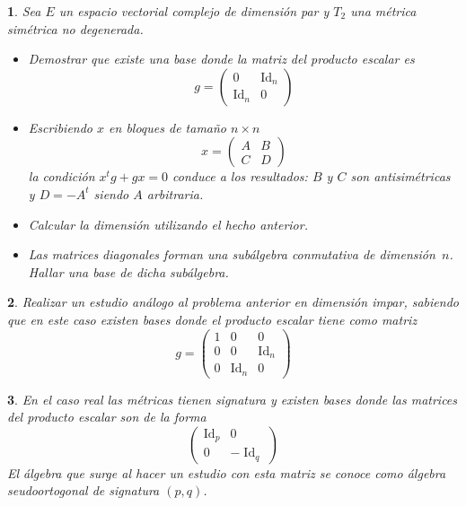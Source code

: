 \documentclass[a4paper,draft,12pt]{scrartcl}
\newtheorem{pro1}{}%
\newenvironment{pro}{\begin{pro1} \rm} {\end{pro1}}
\newcommand{\df}[1]{\textsf{\color{blue}#1}}
\DeclareMathOperator{\Id}{Id}%
\begin{document}
\begin{pro}

Sea $E$ un espacio vectorial complejo de dimensión par y $T_2$ una métrica simétrica no degenerada.

\begin{itemize}

\item Demostrar que existe una base donde la matriz del producto escalar es
$$
g=  \begin{pmatrix}
0 & \Id_n \\
\Id_n& 0
\end{pmatrix}
$$

\item Escribiendo $x$ en bloques de tamaño $n  \times n$
$$
x= \begin{pmatrix} A & B \\ C & D \end{pmatrix}
$$
la condición $x^tg+gx=0$ conduce a los resultados: $B$ y $C$ son antisimétricas y $D=-A^t$ siendo $A$ arbitraria.

\item Calcular la dimensión utilizando el hecho anterior.

\item Las matrices diagonales forman una subálgebra conmutativa de dimensión~$n$.  Hallar una base de dicha subálgebra.

\end{itemize}

\end{pro}

\begin{pro}

Realizar un estudio análogo al problema anterior en dimensión impar, sabiendo que en este caso existen bases donde el producto escalar tiene como matriz
$$
g= \begin{pmatrix}
1 & 0 & 0 \\
0 & 0 & \Id_n \\
0 & \Id_n & 0
\end{pmatrix}
$$

\end{pro}

\begin{pro}

En el caso real las métricas tienen signatura y existen bases donde las matrices del producto escalar son de la forma
$$
\begin{pmatrix} 
\Id_p & 0 \\
0 &- \Id_q
\end{pmatrix}
$$
El álgebra que surge al hacer un estudio con esta matriz se conoce como  \df{álgebra seudoortogonal}  de signatura $(p,q)$.

\end{pro}
\end{document}
